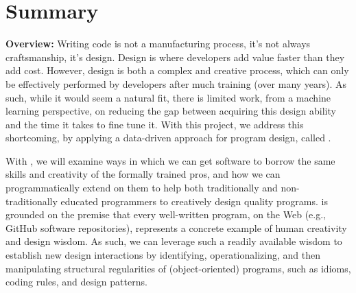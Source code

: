 
\setcounter{section}{1}
\section{Summary \mytitle}

%


{\bf{Overview:}}
%
Writing code is not a manufacturing process, it's not always craftsmanship, it's
design. Design is where developers add value faster than they add cost. However,
design is both a complex and creative process, which can only be effectively
performed by developers after much training (over many years). As such, while it
would seem a natural fit, there is limited work, from a machine learning
perspective, on reducing the gap between acquiring this design ability and the
time it takes to fine tune it. With this project, we address this shortcoming,
by applying a data-driven approach for program design, called \pdm.

With \pdm, we will examine ways in which we can get software to borrow
the same skills and creativity of the formally trained pros, and how
we can programmatically extend on them to help both traditionally and
non-traditionally educated programmers to creatively design quality programs.
\pdm is grounded on the premise that every well-written program, on the
Web (e.g., GitHub software repositories), represents a concrete example
of human creativity and design wisdom. As such, we can leverage such a
readily available wisdom to establish new design interactions by
identifying, operationalizing, and then manipulating structural
regularities of (object-oriented) programs, such as idioms, coding rules,
and design patterns.

